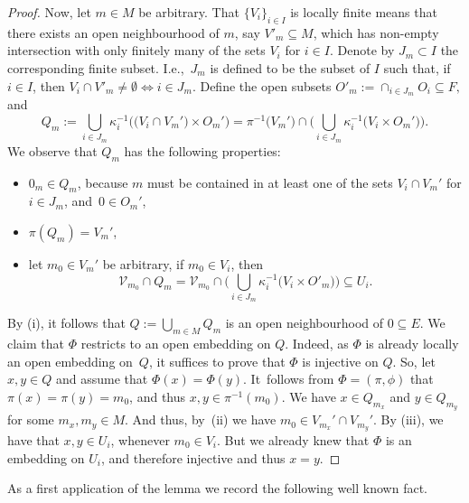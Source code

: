 \documentclass[pdftex]{sigma}
\numberwithin{equation}{section}
\begin{document}
\begin{proof}
Now, let $m \in M$ be arbitrary.
That $\{V_i\}_{i\in I}$ is locally finite means that there exists an open neighbourhood of $m$, say $V'_{m} \subseteq M$, which has non-empty intersection with only finitely many of the sets $V_{i}$ for $i \in I$.
Denote by $J_{m}\subset I$ the corresponding finite subset.
I.e.,~$J_{m}$ is defined to be the subset of $I$ such that, if $i \in I$, then
$V_{i} \cap V'_{m} \neq \emptyset \Longleftrightarrow i \in J_{m}.$
Define the open subsets
$
 O'_{m} := \cap_{i \in J_{m}} O_{i} \subseteq F,
 $ and
\begin{equation*}
 Q_{m} := \bigcup_{i \in J_{m}} \kappa_{i}^{-1}\bigl(\bigl(V_{i}\cap V_{m}'\bigr) \times O_{m}'\bigr) = \pi^{-1}\bigl(V_{m}'\bigr) \cap \biggl(\bigcup_{i \in J_{m}} \kappa_{i}^{-1}\bigl(V_{i} \times O_{m}'\bigr)\biggr).
\end{equation*}
We observe that $Q_{m}$ has the following properties:
\begin{itemize}\itemsep=0pt
 \item[(i)] $0_{m} \in Q_{m}$, because $m$ must be contained in at least one of the sets $V_{i} \cap V_{m}'$ for $i \in J_{m}$, and~$0 \in O_{m}'$,
 \item[(ii)] $\pi(Q_{m}) = V_{m}'$,
 \item[(iii)] let $m_{0} \in V_{m}'$ be arbitrary, if $m_{0} \in V_{i}$, then
 \begin{equation*}
 \mathcal{V}_{m_{0}} \cap Q_{m} = \mathcal{V}_{m_{0}} \cap \biggl( \bigcup_{i \in J_{m}} \kappa_{i}^{-1}\bigl(V_{i} \times O'_{m}\bigr)\biggr) \subseteq U_{i}.
 \end{equation*}
\end{itemize}
By (i), it follows that
$
 Q := \bigcup_{m \in M} Q_{m}
$ is an open neighbourhood of $0 \subseteq E$.
We claim that $\Phi$ restricts to an open embedding on $Q$.
Indeed, as $\Phi$ is already locally an open embedding on~$Q$, it suffices to prove that $\Phi$ is injective on $Q$.
So, let $x,y \in Q$ and assume that $\Phi(x) = \Phi(y)$.
It~follows from $\Phi=(\pi,\phi)$ that $\pi(x) = \pi(y) = m_{0}$, and thus $x,y \in \pi^{-1}(m_{0})$.
We have $x \in Q_{m_{x}}$ and $y \in Q_{m_{y}}$ for some $m_{x},m_{y} \in M$.
And thus, by~(ii) we have $m_{0} \in V_{m_{x}}' \cap V_{m_{y}}'$.
By (iii), we have that $x,y \in U_{i}$, whenever $m_{0} \in V_{i}$.
But we already knew that $\Phi$ is an embedding on $U_i$, and therefore injective and thus $x=y$.
\end{proof}

As a first application of the lemma we record the following well known fact.
\end{document}
